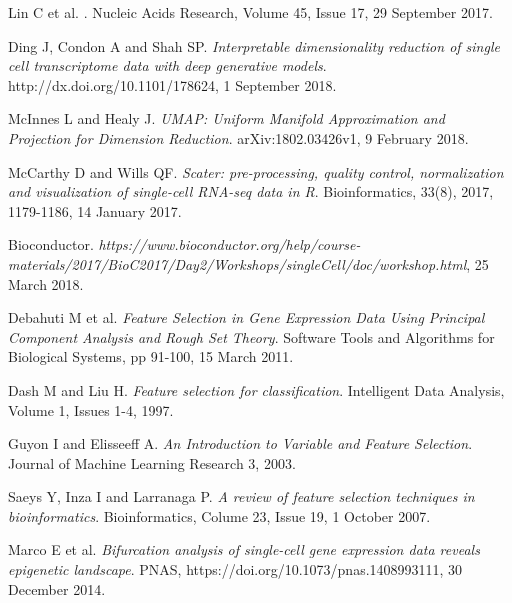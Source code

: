 \documentclass[journal, a4paper]{IEEEtran}
\begin{document}
\begin{thebibliography}{99}
	Lin C et al. . %
	Nucleic Acids Research, Volume 45, Issue 17, 29 September 2017.
	
	Ding J, Condon A and Shah SP. \textit{Interpretable dimensionality reduction of single cell transcriptome data with deep generative models}.
	http://dx.doi.org/10.1101/178624, 1 September 2018.
	
	
	McInnes L and Healy J. \textit{UMAP: Uniform Manifold Approximation and Projection for Dimension Reduction}.
	arXiv:1802.03426v1, 9 February 2018.
	
	McCarthy D and Wills QF. \textit{Scater: pre-processing, quality control, normalization and visualization of single-cell RNA-seq data in R}.
	Bioinformatics, 33(8), 2017, 1179-1186, 14 January 2017.
	
	Bioconductor. \textit{https://www.bioconductor.org/help/course-materials/2017/BioC2017/Day2/Workshops/singleCell/doc/workshop.html}, 25 March 2018.
	
	
	Debahuti M et al. \textit{Feature Selection in Gene Expression Data Using Principal Component Analysis and Rough Set Theory}.
	Software Tools and Algorithms for Biological Systems, pp 91-100, 15 March 2011.
	
	Dash M and Liu H. \textit{Feature selection for classification}.
	Intelligent Data Analysis, Volume 1, Issues 1-4, 1997.
	
	Guyon I and Elisseeff A. \textit{An Introduction to Variable and Feature Selection}.
	Journal of Machine Learning Research 3, 2003.
	
	Saeys Y, Inza I and Larranaga P. \textit{A review of feature selection techniques in bioinformatics}.
	Bioinformatics, Colume 23, Issue 19, 1 October 2007.

	
	
		
	Marco E et al. \textit{Bifurcation analysis of single-cell gene expression data reveals epigenetic landscape}.
	PNAS, https://doi.org/10.1073/pnas.1408993111, 30 December 2014.
	

\end{thebibliography}
\end{document}
